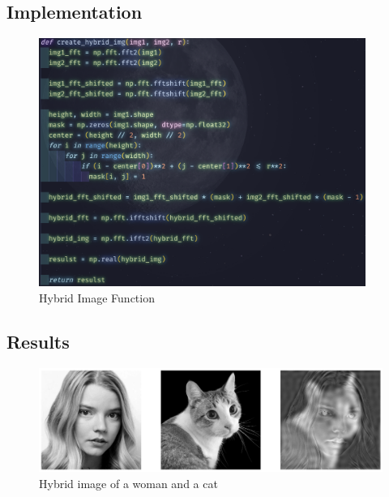\subsection{Implementation}
\begin{figure} [!h]
    \centering
    \includegraphics[width=0.95\textwidth]{img/code/hybrid.png}
    \caption{Hybrid Image Function}
\end{figure}

\subsection{Results}
\begin{figure} [!h]
    \centering
    \includegraphics[width=1\textwidth]{img/hybrid.png}
    \caption{Hybrid image of a woman and a cat}
\end{figure}